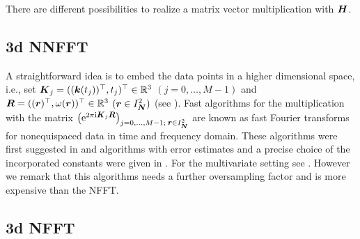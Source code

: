 \documentclass[journal]{IEEEtran}
\def\ti{\mbox{\scriptsize{\rm i}}}
\newcommand{\eip}[1]{{\rm e}^{ 2\pi{\ti} #1}}
\newcommand{\zb}[1]{\mbox{\boldmath{${#1}$}}}
\newcommand{\zbs}[1]{\mbox{\boldmath\scriptsize{${#1}$}}}
\newcommand{\zbss}[1]{\mbox{\boldmath\tiny{${#1}$}}}
\numberwithin{equation}{section}
\numberwithin{table}{section}
\numberwithin{figure}{section}
\begin{document}
There are different possibilities to realize a matrix vector
multiplication with $\zb H$.

\subsection{3d NNFFT}
  
A straightforward idea is to embed the data points in a higher
   dimensional space, i.e., set $\zb K_j= ((\zb k(t_j))^{\top},
   t_j)^{\top}\in \mathbb{R}^3$ $(j=0,\ldots, M-1)$ and $\zb R= ((\zb
   r)^{\top}, 
   \omega(\zb r))^{\top}\in \mathbb{R}^3$ $(\zb r\in I_{\zbs N}^2)$ (see
   \cite[Example 2]{LeGr05}). Fast algorithms for the multiplication
   with the matrix $ 
  \left(\eip{\zbs K_j\zbs R}\right)_{j=0,\hdots,M-1;\;\zbs r\in 
  I_{\zbss N}^2}$ are known as fast Fourier transforms for
   nonequispaced data in time and frequency domain. These algorithms were
   first suggested in \cite{duro93} and algorithms with error
   estimates and a precise choice of the incorporated constants were
   given in \cite{ElSt}. For the multivariate setting see
   \cite{postta01}. However we remark that this algorithms needs a
   further oversampling factor and is more expensive than the NFFT.

\subsection{3d NFFT}
\end{document}
